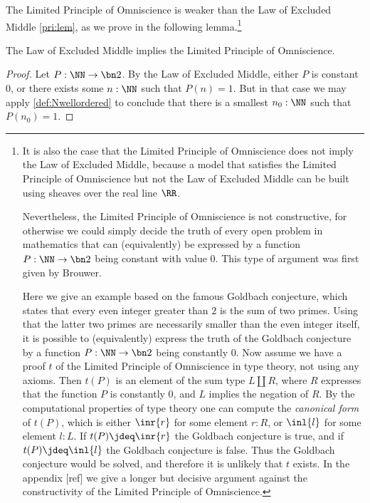 The Limited Principle of Omniscience is weaker than the Law of Excluded Middle \cref{pri:lem}, as we prove in the following lemma.\footnote{%
  It is also the case that the Limited Principle of Omniscience does not imply the Law of Excluded Middle, because
  a model that satisfies the Limited Principle of Omniscience but not the Law of Excluded Middle can be built using sheaves over the real line $\RR$.

  Nevertheless, the Limited Principle of Omniscience is not constructive,
  for otherwise we could simply decide the truth of every open problem in mathematics
  that can (equivalently) be expressed by a function $P:\NN\to\bn 2$ being constant with value $0$.
  This type of argument was first given by Brouwer. %

  Here we give an example based on the famous Goldbach conjecture,
  which states that every even integer greater than $2$ is the sum of two primes. Using that
  the latter two primes are necessarily smaller than the even integer itself, it is possible
  to (equivalently) express the truth of the Goldbach conjecture by a function $P:\NN\to\bn 2$
  being constantly $0$. Now assume we have a proof $t$ of the Limited Principle of Omniscience
  in type theory, not using any axioms. Then $t(P)$ is an element of the
  sum type $L\amalg R$, where $R$ expresses that the function $P$ is constantly $0$,
  and $L$ implies the negation of $R$.
  By the computational properties of type theory one can compute the
  \emph{canonical form} of $t(P)$, which is either $\inr{r}$ for some element $r:R$,
  or $\inl{l}$ for some element $l:L$. If $t(P)\jdeq\inr{r}$ the Goldbach conjecture is true,
  and if $t(P)\jdeq\inl{l}$ the Goldbach conjecture is false. Thus the Goldbach conjecture
  would be solved, and therefore it is unlikely that $t$ exists.
  In the appendix [ref] we give a longer but decisive argument against the constructivity of
  the Limited Principle of Omniscience.
}


\begin{lemma}
  The Law of Excluded Middle implies the Limited Principle of Omniscience.
\end{lemma}

\begin{proof}
  Let $P:\NN\to\bn 2$. By the Law of Excluded Middle, either $P$ is constant $0$,
  or there exists some $n:\NN$ such that $P(n)=1$.
  But in that case we may apply \cref{def:Nwellordered}
  to conclude that there is a smallest $n_0:\NN$ such that $P(n_0)=1$.
\end{proof}

